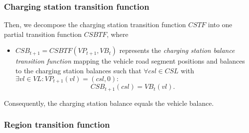 \subsubsection{Charging station transition function}
\label{transitions_stations}

Then, we decompose the charging station transition function $CSTF$ into one partial transition function $CSBTF$, where
\begin{itemize}
	\item $CSB_{t+1} = CSBTF(VP_{t+1}, VB_t)$ represents the \textit{charging station balance transition function} mapping the vehicle road segment positions and balances to the charging station balances such that $\forall csl \in CSL$ with $\exists vl \in VL: VP_{t+1}(vl) = (csl, 0):$
	\[
		CSB_{t+1}(csl) = VB_{t}(vl) \textrm{.}
	\]
\end{itemize}
Consequently, the charging station balance equals the vehicle balance.

\subsubsection{Region transition function}
\label{transitions_regions}

